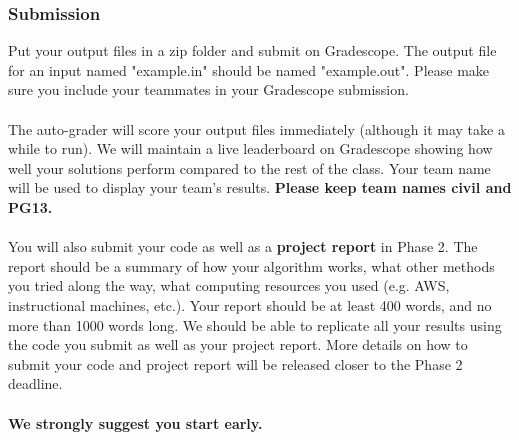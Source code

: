 \documentclass{article}
\begin{document}
\subsubsection*{Submission}
Put your output files in a zip folder and submit on Gradescope. The output file for an input named "example.in" should be named "example.out". Please make sure you include your teammates in your Gradescope submission.
\\ \\
The auto-grader will score your output files immediately (although it may take a while to run). We will maintain a live leaderboard on Gradescope showing how well your solutions perform compared to the rest of the class. Your team name will be used to display your team’s results. \textbf{Please keep team names civil and PG13.}
\\ \\
You will also submit your code as well as a \textbf{project report} in Phase 2. The report should be a summary of how your algorithm works, what other methods you tried along the way, what computing resources you used (e.g. AWS, instructional machines, etc.). Your report should be at least 400 words, and no more than 1000 words long. We should be able to replicate all your results using the code you submit as well as your project report. More details on how to submit your code and project report will be released closer to the Phase 2 deadline.
\\ \\
\textbf{We strongly suggest you start early.}
\end{document}
